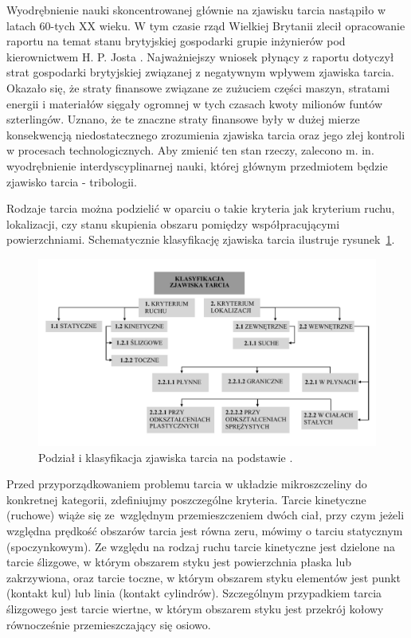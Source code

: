 \documentclass[12pt,a4paper,openright]{report} %
\begin{document}
Wyodrębnienie nauki skoncentrowanej głównie na zjawisku tarcia nastąpiło w latach 60-tych XX wieku. W tym czasie rząd Wielkiej Brytanii zlecił opracowanie raportu na temat stanu brytyjskiej gospodarki grupie inżynierów pod kierownictwem \linebreak H. P. Josta \cite{Hebda}. Najważniejszy wniosek płynący z raportu dotyczył strat gospodarki brytyjskiej związanej z negatywnym wpływem zjawiska tarcia. Okazało się, że straty finansowe związane ze zużuciem części maszyn, stratami energii i materiałów sięgały ogromnej w tych czasach kwoty milionów funtów szterlingów. Uznano, że te znaczne straty finansowe były w dużej mierze konsekwencją niedostatecznego zrozumienia zjawiska tarcia oraz jego złej kontroli w procesach technologicznych. Aby zmienić ten stan rzeczy, zalecono m. in. wyodrębnienie interdyscyplinarnej nauki, której głównym przedmiotem będzie \linebreak zjawisko tarcia - tribologii. 

%
%
% 
Rodzaje tarcia można podzielić w oparciu o takie kryteria jak kryterium ruchu, lokalizacji, czy stanu skupienia obszaru pomiędzy współpracującymi powierzchniami. Schematycznie klasyfikację zjawiska tarcia ilustruje rysunek~\ref{klas_tar}.
\begin{figure}[h!]
\centering
\includegraphics[width=14cm, clip]{rysunki/klasyfikacja_tarcia.pdf}
\caption{Podział i klasyfikacja zjawiska tarcia na podstawie \cite{Janecki}.}
\label{klas_tar}
\end{figure}

Przed przyporządkowaniem problemu tarcia w układzie mikroszczeliny do konkretnej kategorii, zdefiniujmy poszczególne kryteria.
{Tarcie kinetyczne} (ruchowe) wiąże się ze~względnym przemieszczeniem dwóch ciał, przy czym jeżeli względna prędkość obszarów tarcia jest równa zeru, mówimy o tarciu {statycznym} (spoczynkowym). Ze względu na rodzaj ruchu tarcie kinetyczne jest dzielone na {tarcie ślizgowe}, w którym obszarem styku jest powierzchnia płaska lub zakrzywiona, oraz {tarcie toczne}, w którym obszarem styku elementów jest punkt (kontakt kul) lub linia (kontakt cylindrów). Szczególnym przypadkiem tarcia ślizgowego jest {tarcie wiertne}, w którym obszarem styku jest przekrój kołowy równocześnie przemieszczający się osiowo.   
\end{document}
